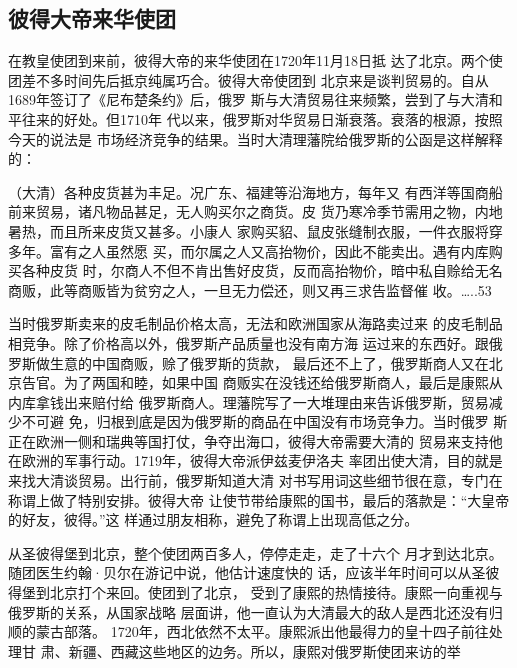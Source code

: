 \subsection{彼得大帝来华使团}
\par
在教皇使团到来前，彼得大帝的来华使团在1720年11月18日抵%
达了北京。两个使团差不多时间先后抵京纯属巧合。彼得大帝使团到%
北京来是谈判贸易的。自从1689年签订了《尼布楚条约》后，俄罗%
斯与大清贸易往来频繁，尝到了与大清和平往来的好处。但1710年%
代以来，俄罗斯对华贸易日渐衰落。衰落的根源，按照今天的说法是%
市场经济竞争的结果。当时大清理藩院给俄罗斯的公函是这样解释的：%
\par
{\bookkai （大清）各种皮货甚为丰足。况广东、福建等沿海地方，每年又}%
{\bookkai 有西洋等国商船前来贸易，诸凡物品甚足，无人购买尔之商货。皮}%
{\bookkai 货乃寒冷季节需用之物，内地暑热，而且所来皮货又甚多。小康人}%
{\bookkai 家购买貂、鼠皮张缝制衣服，一件衣服将穿多年。富有之人虽然愿}%
{\bookkai 买，而尔属之人又高抬物价，因此不能卖出。遇有内库购买各种皮货}%
{\bookkai 时，尔商人不但不肯出售好皮货，反而高抬物价，暗中私自赊给无名}%
{\bookkai 商贩，此等商贩皆为贫穷之人，一旦无力偿还，则又再三求告监督催}%
{\bookkai 收。…..53}%
\par
当时俄罗斯卖来的皮毛制品价格太高，无法和欧洲国家从海路卖过来%
的皮毛制品相竞争。除了价格高以外，俄罗斯产品质量也没有南方海%
运过来的东西好。跟俄罗斯做生意的中国商贩，赊了俄罗斯的货款，%
最后还不上了，俄罗斯商人又在北京告官。为了两国和睦，如果中国%
商贩实在没钱还给俄罗斯商人，最后是康熙从内库拿钱出来赔付给%
俄罗斯商人。理藩院写了一大堆理由来告诉俄罗斯，贸易减少不可避%
免，归根到底是因为俄罗斯的商品在中国没有市场竞争力。当时俄罗%
斯正在欧洲一侧和瑞典等国打仗，争夺出海口，彼得大帝需要大清的%
贸易来支持他在欧洲的军事行动。1719年，彼得大帝派伊兹麦伊洛夫%
率团出使大清，目的就是来找大清谈贸易。出行前，俄罗斯知道大清%
对书写用词这些细节很在意，专门在称谓上做了特别安排。彼得大帝%
让使节带给康熙的国书，最后的落款是：“大皇帝的好友，彼得。”这%
样通过朋友相称，避免了称谓上出现高低之分。%
\par
从圣彼得堡到北京，整个使团两百多人，停停走走，走了十六个%
月才到达北京。随团医生约翰·贝尔在游记中说，他估计速度快的%
话，应该半年时间可以从圣彼得堡到北京打个来回。使团到了北京，%
受到了康熙的热情接待。康熙一向重视与俄罗斯的关系，从国家战略%
层面讲，他一直认为大清最大的敌人是西北还没有归顺的蒙古部落。%
1720年，西北依然不太平。康熙派出他最得力的皇十四子前往处理甘%
肃、新疆、西藏这些地区的边务。所以，康熙对俄罗斯使团来访的举%
